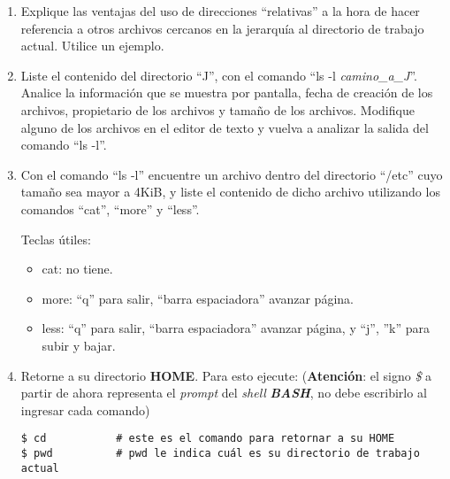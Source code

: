 \documentclass[12pt]{article}
\newcommand{\bash}{\textbf{\emph{BASH}}}
\begin{document}
\begin{enumerate}
    \item Explique las ventajas del uso de direcciones ``relativas'' a la
            hora de hacer referencia a otros archivos cercanos en la jerarquía
            al directorio de trabajo actual. Utilice un ejemplo.

    \item Liste el contenido del directorio ``J'', con el comando ``ls -l
        \emph{camino\_a\_J}''.  Analice la información que se muestra por
        pantalla, fecha de creación de los archivos, propietario de los
        archivos y tamaño de los archivos. Modifique alguno de los archivos en
        el editor de texto y vuelva a analizar la salida del comando ``ls
        -l''.

    \item Con el comando ``ls -l'' encuentre un archivo dentro del directorio
        ``/etc'' cuyo tamaño sea mayor a 4KiB, y liste el contenido de dicho
        archivo utilizando los comandos ``cat'', ``more'' y ``less''.

    Teclas útiles:

    \begin{itemize}

        \itemsep2pt \parskip0pt 

        \item cat: no tiene.

        \item more: ``q'' para salir, ``barra espaciadora'' avanzar página.

        \item less: ``q'' para salir, ``barra espaciadora'' avanzar página, y
            ``j'', ''k'' para subir y bajar.

    \end{itemize}

    \item Retorne a su directorio \textbf{HOME}. Para esto ejecute:
        (\textbf{Atención}: el signo \emph{\$} a partir de ahora representa el
        \emph{prompt} del \emph{shell} \bash, no debe escribirlo al ingresar
        cada comando)

        \begin{verbatim}
$ cd           # este es el comando para retornar a su HOME
$ pwd          # pwd le indica cuál es su directorio de trabajo actual
        \end{verbatim}

\end{enumerate}
\end{document}
